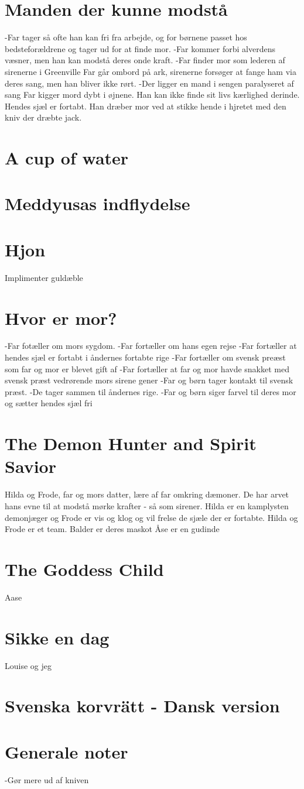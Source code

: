 \documentclass[]{article}
\begin{document}
	\section{Manden der kunne modstå}
	-Far tager så ofte han kan fri fra arbejde, og for børnene passet hos bedsteforældrene og tager ud for at finde mor.
	-Far kommer forbi alverdens væsner, men han kan modstå deres onde kraft. 
	-Far finder mor som lederen af sirenerne i Greenville
	Far går ombord på ark, sirenerne forsøger at fange ham via deres sang, men han bliver ikke rørt.
	-Der ligger en mand i sengen paralyseret af sang
	Far kigger mord dybt i øjnene. Han kan ikke finde sit livs kærlighed derinde. Hendes sjæl er fortabt. Han dræber mor ved at stikke hende i hjretet med den kniv der dræbte jack.
	
	\section{A cup of water}
	
	\section{Meddyusas indflydelse}
	
	\section{Hjon}
	Implimenter guldæble
	
	\section{Hvor er mor?}
	-Far fotæller om mors sygdom.
	-Far fortæller om hans egen rejse
	-Far fortæller at hendes sjæl er fortabt i åndernes fortabte rige
	-Far fortæller om svensk preæst som far og mor er blevet gift af
	-Far fortæller at far og mor havde snakket med svensk præst vedrørende mors sirene gener
	-Far og børn tager kontakt til svensk præst.
	-De tager sammen til åndernes rige.
	-Far og børn siger farvel til deres mor og sætter hendes sjæl fri
	
	\section{The Demon Hunter and Spirit Savior}
	Hilda og Frode, far og mors datter, lære af far omkring dæmoner. De har arvet hans evne til at modstå mørke krafter - så som sirener.
	Hilda er en kamplysten demonjæger og Frode er vis og klog og vil frelse de sjæle der er fortabte.
	Hilda og Frode er et team. Balder er deres maskot
	Åse er en gudinde
	 
	\section{The Goddess Child}
	Aase
	
	\section{Sikke en dag}
	Louise og jeg
	
	\section{Svenska korvrätt - Dansk version} 
	
	\section{Generale noter}
	-Gør mere ud af kniven
	
\end{document}
